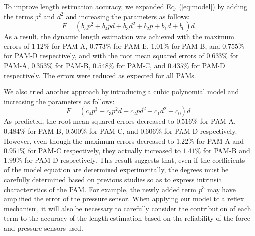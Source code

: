 To improve length estimation accuracy, we expanded Eq. (\ref{eq:model}) by adding the terms $p^2$ and $d^2$ and increasing the parameters as follows:
\begin{equation}
\label{eq:model_2d(1)}
F = (b_5p^2 + b_4pd + b_3d^2 + b_2p+b_1d+b_0)d
\end{equation}
As a result, the dynamic length estimation was achieved with the maximum errors of $1.12\%$ for PAM-A, $0.773\%$ for PAM-B, $1.01\%$ for PAM-B, and $0.755\%$ for PAM-D respectively, and with the root mean squared errors of $0.633\%$ for PAM-A, $0.353\%$ for PAM-B, $0.548\%$ for PAM-C, and $0.435\%$ for PAM-D respectively. The errors were reduced as expected for all PAMs. 


We also tried another approach by introducing a cubic polynomial model and increasing the parameters as follows:
\begin{equation}
    \label{eq:model_3d}
    F = (c_4p^3+c_3p^2d+c_2pd^2+c_1d^2+c_0)d
\end{equation}
As predicted, the root mean squared errors decreased to $0.516\%$ for PAM-A, $0.484\%$ for PAM-B, $0.500\%$ for PAM-C, and $0.606\%$ for PAM-D respectively. 
However, even though the maximum errors decreased to $1.22\%$ for PAM-A and $0.951\%$ for PAM-C respectively, they actually increased to $1.41\%$ for PAM-B and $1.99\%$ for PAM-D respectively. This result suggests that, even if the coefficients of the model equation are determined experimentally, the degrees must be carefully determined based on previous studies so as to express intrinsic characteristics of the PAM. For example, the newly added term $p^3$ may have amplified the error of the pressure sensor. When applying our model to a reflex mechanism, it will also be necessary to carefully consider the contribution of each term to the accuracy of the length estimation based on the reliability of the force and pressure sensors used.

